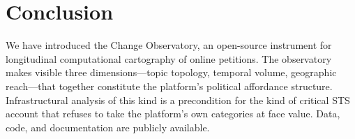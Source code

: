 \documentclass[a4paper, justified, notoc, nobib]{tufte-handout}
\begin{document}
\section{Conclusion}

We have introduced the Change Observatory, an open-source instrument for
longitudinal computational cartography of online petitions.
The observatory makes visible three dimensions---topic topology, temporal
volume, geographic reach---that together constitute the platform's political
affordance structure.
Infrastructural analysis of this kind is a precondition for the kind of
critical STS account that refuses to take the platform's own categories at
face value.
Data, code, and documentation are publicly available.

\bigskip
\printbibliography
\end{document}
